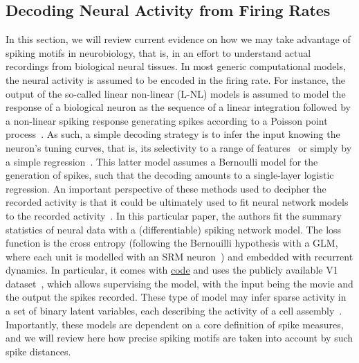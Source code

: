 \documentclass[brainsci, %
               review,accept,pdftex,moreauthors
               ]{Definitions/mdpi}
\begin{document}
\subsection{Decoding Neural Activity from Firing Rates}
In this section, we will review current evidence on how we may take advantage of spiking motifs in neurobiology, that is, in an effort to understand actual recordings from biological neural tissues. In most generic computational models, the neural activity is assumed to be encoded in the firing rate. For instance, the output of the so-called linear non-linear (L-NL) models is assumed to model the response of a biological neuron as the sequence of a linear integration followed by a non-linear spiking response generating spikes according to a Poisson point process~\citep{simoncelli_characterization_2003}. As such, a simple decoding strategy is to infer the input knowing the neuron's tuning curves, that is, its selectivity to a range of features~\citep{jazayeri_optimal_2006} or simply by a simple regression~\citep{berens_fast_2012}. This latter model assumes a Bernoulli model for the generation of spikes, such that the decoding amounts to a single-layer logistic regression. An important perspective of these methods used to decipher the recorded activity is that it could be ultimately used to fit neural network models to the recorded activity~\citep{bellec_fitting_2021}. In this particular paper, the authors fit the summary statistics of neural data with a (differentiable) spiking network model. The loss function is the cross entropy (following the Bernouilli hypothesis with a GLM, where each unit is modelled with an SRM neuron~\citep{gerstner_time_1995}) and embedded with recurrent dynamics. In particular, it comes with \href{https://github.com/EPFL-LCN/pub-bellec-wang-2021-sample-and-measure}{code} and uses the publicly available V1 dataset~\citep{kohn_utah_2016}, which allows supervising the model, with the input being the movie and the output the spikes recorded. These type of model may infer sparse activity in a set of binary latent variables, each describing the activity of a cell assembly~\citep{warner_probabilistic_2022}.
 Importantly, these models are dependent on a core definition of spike measures, and we will review here how precise spiking motifs are taken into account by such spike distances.
%
\end{document}
